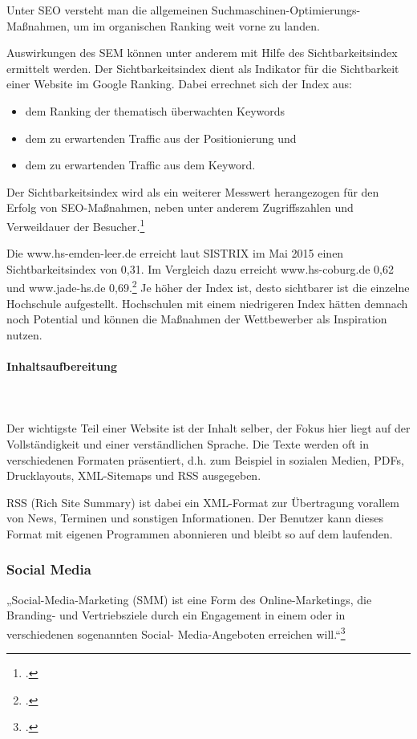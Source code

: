 Unter SEO versteht man die allgemeinen Suchmaschinen-Optimierungs-Maßnahmen, um im organischen Ranking weit vorne zu landen.

Auswirkungen des SEM können unter anderem mit Hilfe des Sichtbarkeitsindex ermittelt werden. Der Sichtbarkeitsindex dient als Indikator für die Sichtbarkeit einer Website im Google Ranking. Dabei errechnet sich der Index aus:

\begin{itemize}
	\item dem Ranking der thematisch überwachten Keywords
	\item dem zu erwartenden Traffic aus der Positionierung und
	\item dem zu erwartenden Traffic aus dem Keyword.
\end{itemize}

Der Sichtbarkeitsindex wird als ein weiterer Messwert herangezogen für den Erfolg von SEO-Maßnahmen, neben unter anderem Zugriffszahlen und Verweildauer der Besucher.\footcite{onpage_sichtbarkeitsindex_2015}

Die www.hs-emden-leer.de erreicht laut SISTRIX im Mai 2015 einen Sichtbarkeitsindex von 0,31. Im Vergleich dazu erreicht www.hs-coburg.de 0,62 und www.jade-hs.de 0,69.\footcite{sistrix_sichtbarkeitsindex_2015} Je höher der Index ist, desto sichtbarer ist die einzelne Hochschule aufgestellt. Hochschulen mit einem niedrigeren Index hätten demnach noch Potential und können die Maßnahmen der Wettbewerber als Inspiration nutzen.

\paragraph{Inhaltsaufbereitung}\mbox{}\\\\
Der wichtigste Teil einer Website ist der Inhalt selber, der Fokus hier liegt auf der Vollständigkeit und einer verständlichen Sprache. Die Texte werden oft in verschiedenen Formaten präsentiert, d.h. zum Beispiel in sozialen Medien, PDFs, Drucklayouts, XML-Sitemaps und RSS ausgegeben.

RSS (Rich Site Summary) ist dabei ein XML-Format zur Übertragung vorallem von News, Terminen und sonstigen Informationen. Der Benutzer kann dieses Format mit eigenen Programmen abonnieren und bleibt so auf dem laufenden.

\subsubsection{Social Media}
„Social-Media-Marketing (SMM) ist eine Form des Online-Marketings, die Branding- und Vertriebsziele durch ein Engagement in einem oder in verschiedenen sogenannten Social- Media-Angeboten erreichen will.“\footcite[Vgl.][31]{lammenett_2014}


